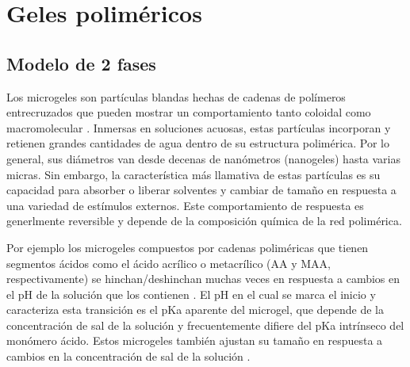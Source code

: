 
\chapter{Geles polim\'ericos} %

\label{Chapter3} %


\newcommand{\keyword}[1]{\textbf{#1}}
\newcommand{\tabhead}[1]{\textbf{#1}}
\newcommand{\code}[1]{\texttt{#1}}
\newcommand{\file}[1]{\texttt{\bfseries#1}}
\newcommand{\option}[1]{\texttt{\itshape#1}}





\section{Modelo de 2 fases}

Los microgeles son part\'iculas blandas hechas de cadenas de pol\'imeros entrecruzados que pueden mostrar un comportamiento tanto coloidal como macromolecular \cite{plamper2017functional}.
Inmersas en soluciones acuosas, estas part\'iculas incorporan y retienen grandes cantidades de agua dentro de su estructura polim\'erica.
Por lo general, sus di\'ametros van desde decenas de nan\'ometros (nanogeles) hasta varias micras.
Sin embargo, la caracter\'istica m\'as llamativa de estas part\'iculas es su capacidad para absorber o liberar solventes y cambiar de tama\~no en respuesta a una variedad de est\'imulos externos.
Este comportamiento de respuesta es  generlmente reversible y depende de la composici\'on qu\'imica de la red polim\'erica.


Por ejemplo los microgeles compuestos por cadenas polim\'ericas que tienen segmentos \'acidos como el \'acido acr\'ilico o metacr\'ilico (AA y MAA, respectivamente) se hinchan/deshinchan muchas veces en respuesta a cambios en el pH de la soluci\'on que los contienen \cite{snowden1996colloidal}.
El pH en el cual se marca el inicio y caracteriza esta transici\'on es el pKa aparente del microgel, que depende de la concentraci\'on de sal de la soluci\'on y frecuentemente difiere del pKa intrínseco del mon\'omero \'acido.
Estos microgeles tambi\'en ajustan su tama\~no en respuesta a cambios en la concentraci\'on de sal de la soluci\'on \cite{snowden1996colloidal}.

